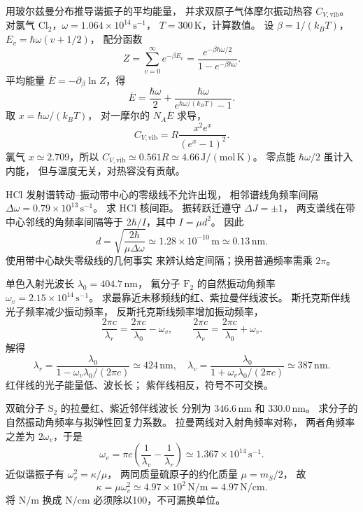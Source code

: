 用玻尔兹曼分布推导谐振子的平均能量，
并求双原子气体摩尔振动热容 $C_{V,\mathrm{vib}}$。
对氯气 $\mathrm{Cl_2}$，$\omega=1.064\times10^{14}\,\mathrm{s^{-1}}$，
$T=300\,\mathrm K$，计算数值。
\exsolution
设 $\beta=1/(k_BT)$，
$E_v=\hbar\omega(v+1/2)$，
配分函数
\[
 Z=\sum_{v=0}^\infty e^{-\beta E_v}
 =\frac{e^{-\beta\hbar\omega/2}}{1-e^{-\beta\hbar\omega}}.
\]
平均能量
$\overline E=-\partial_\beta\ln Z$，得
\[
 \boxed{\overline E=
 \frac{\hbar\omega}{2}
 +\frac{\hbar\omega}{e^{\hbar\omega/(k_BT)}-1}}.
\]
取 $x=\hbar\omega/(k_BT)$，
对一摩尔的 $N_A\overline E$ 求导，
\[
 \boxed{C_{V,\mathrm{vib}}=
 R\frac{x^2e^x}{(e^x-1)^2}}.
\]
氯气 $x\simeq2.709$，所以
$\boxed{C_{V,\mathrm{vib}}\simeq0.561R
 \simeq4.66\,\mathrm{J/(mol\,K)}}$。
\excheck 零点能 $\hbar\omega/2$ 虽计入内能，
但与温度无关，对热容没有贡献。

HCl 发射谱转动--振动带中心的零级线不允许出现，
相邻谱线角频率间隔
$\Delta\omega=0.79\times10^{13}\,\mathrm{s^{-1}}$。
求 HCl 核间距。
\exsolution
振转跃迁遵守 $\Delta J=\pm1$，
两支谱线在带中心邻线的角频率间隔等于
$2\hbar/I$，其中 $I=\mu d^2$。
因此
\[
 \boxed{d=\sqrt{\frac{2\hbar}{\mu\Delta\omega}}
 \simeq1.28\times10^{-10}\,\mathrm m
 \simeq0.13\,\mathrm{nm}}.
\]
\excheck 使用带中心缺失零级线的几何事实
来辨认给定间隔；换用普通频率需乘 $2\pi$。

单色入射光波长 $\lambda_0=404.7\,\mathrm{nm}$，
氟分子 $\mathrm{F_2}$ 的自然振动角频率
$\omega_v=2.15\times10^{14}\,\mathrm{s^{-1}}$。
求最靠近未移频线的红、紫拉曼伴线波长。
\exsolution
斯托克斯伴线光子频率减少振动频率，
反斯托克斯线频率增加振动频率，
\[
 \frac{2\pi c}{\lambda_r}=
 \frac{2\pi c}{\lambda_0}-\omega_v,\qquad
 \frac{2\pi c}{\lambda_v}=
 \frac{2\pi c}{\lambda_0}+\omega_v.
\]
解得
\[
 \boxed{\lambda_r=
 \frac{\lambda_0}{1-\omega_v\lambda_0/(2\pi c)}
 \simeq424\,\mathrm{nm}},\quad
 \boxed{\lambda_v=
 \frac{\lambda_0}{1+\omega_v\lambda_0/(2\pi c)}
 \simeq387\,\mathrm{nm}}.
\]
\excheck 红伴线的光子能量低、波长长；
紫伴线相反，符号不可交换。

双硫分子 $\mathrm{S_2}$ 的拉曼红、紫近邻伴线波长
分别为 $346.6\,\mathrm{nm}$ 和 $330.0\,\mathrm{nm}$。
求分子的自然振动角频率与拟弹性回复力系数。
\exsolution
拉曼两线对入射角频率对称，
两者角频率之差为 $2\omega_v$，于是
\[
 \boxed{\omega_v=\pi c\left(
 \frac1{\lambda_v}-\frac1{\lambda_r}\right)
 \simeq1.367\times10^{14}\,\mathrm{s^{-1}}}.
\]
近似谐振子有
$\omega_v^2=\kappa/\mu$，
两同质量硫原子的约化质量 $\mu=m_S/2$，
故
\[
 \boxed{\kappa=\mu\omega_v^2
 \simeq4.97\times10^2\,\mathrm{N/m}
 =4.97\,\mathrm{N/cm}}.
\]
\excheck 将 $\mathrm{N/m}$ 换成 $\mathrm{N/cm}$
必须除以100，不可漏换单位。

